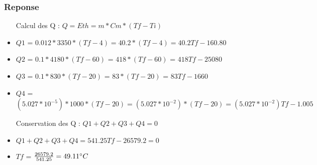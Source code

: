 \subsubsection{Reponse}
\begin{itemize}
    \item[Calcul des Q] : $Q = Eth = m * Cm * (Tf-Ti)$
    \item $Q1$ = $0.012 * 3350 * (Tf - 4) = 40.2 * (Tf-4) = 40.2Tf - 160.80$
    \item $Q2$ = $0.1 * 4180 * (Tf - 60)$ = $418 * (Tf - 60)$ = $418Tf - 25080$
    \item $Q3$ = $0.1 * 830 * (Tf - 20)$ = $83 * (Tf - 20)$ = $83Tf - 1660$
    \item $Q4$ = $(5.027*10^{-5}) * 1000 * (Tf - 20) = (5.027*10^{-2}) * (Tf-20) = (5.027*10^{-2})Tf - 1.005$
    \item[Conservation des Q] : $Q1 + Q2 +Q3 + Q4 = 0$
    \item $Q1 + Q2 + Q3 + Q4 = 541.25Tf - 26579.2 = 0$
    \item $Tf$ = $\frac{26579.2}{541.25} = 49.11\celsius $
\end{itemize}
